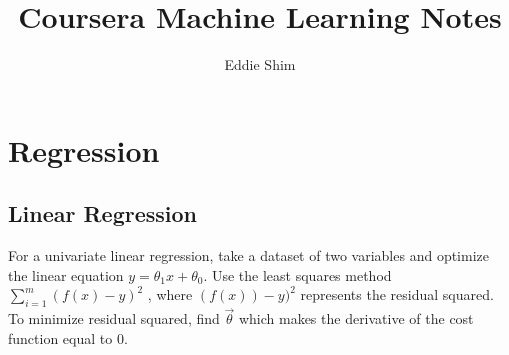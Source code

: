 \documentclass[titlepage]{article}
\author{Eddie Shim}
\title{Coursera Machine Learning Notes}
\begin{document}
	\maketitle
	
	\section{Regression}
	\subsection{Linear Regression}
	For a univariate linear regression, take a dataset of two variables and optimize the linear equation $y = \theta_1 x + \theta_0$. Use the least squares method $\sum_{i=1}^{m} (f(x) - y)^2$ , where $(f(x)) -y)^2$ represents the residual squared. To minimize residual squared, find $\vec\theta$ which makes the derivative of the cost function equal to 0. 
	
\end{document}
